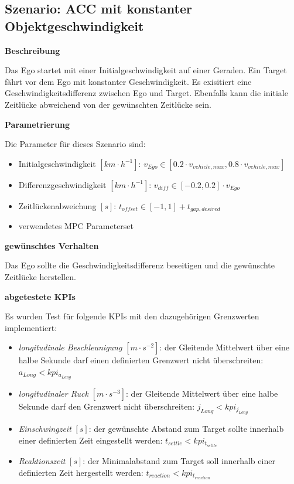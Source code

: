 \subsection{Szenario: ACC mit konstanter Objektgeschwindigkeit}
\textbf{Beschreibung}

\noindent Das Ego startet mit einer Initialgeschwindigkeit auf einer Geraden. Ein Target fährt vor dem Ego mit konstanter Geschwindigkeit. Es exisitiert eine Geschwindigkeitsdifferenz zwischen Ego und Target. Ebenfalls kann die initiale Zeitlücke abweichend von der gewünschten Zeitlücke sein.

\bigskip\noindent\textbf{Parametrierung}

\noindent Die Parameter für dieses Szenario sind:
\begin{itemize}
    \item Initialgeschwindigkeit $[km\cdot h^{-1}]$: $v_{Ego} \in [0.2\cdot v_{vehicle,max}, 0.8\cdot v_{vehicle,max}]$
    \item Differenzgeschwindigkeit $[km\cdot h^{-1}]$: $v_{diff} \in [-0.2,0.2]\cdot v_{Ego}$
    \item Zeitlückenabweichung $[s]$: $t_{offset} \in [-1,1] + t_{gap,desired}$
    \item verwendetes MPC Parameterset
\end{itemize}

\bigskip\noindent\textbf{gewünschtes Verhalten}

\noindent Das Ego sollte die Geschwindigkeitsdifferenz beseitigen und die gewünschte Zeitlücke herstellen.

\bigskip\noindent\textbf{abgetestete KPIs}

\noindent Es wurden Test für folgende KPIs mit den dazugehörigen Grenzwerten implementiert:
\begin{itemize}
    \item \textit{longitudinale Beschleunigung} $[m\cdot s^{-2}]$: der Gleitende Mittelwert über eine halbe Sekunde darf einen definierten Grenzwert nicht überschreiten: $a_{Long} < kpi_{a_{Long}}$
    \item \textit{longitudinaler Ruck} $[m\cdot s^{-3}]$: der Gleitende Mittelwert über eine halbe Sekunde darf den Grenzwert nicht überschreiten: $j_{Long} < kpi_{j_{Long}}$
    \item \textit{Einschwingzeit} $[s]$: der gewünschte Abstand zum Target sollte innerhalb einer definierten Zeit eingestellt werden: $t_{settle} < kpi_{t_{settle}}$
    \item \textit{Reaktionszeit} $[s]$: der Minimalabstand zum Target soll innerhalb einer definierten Zeit hergestellt werden: $t_{reaction} < kpi_{t_{reaction}}$
\end{itemize}

